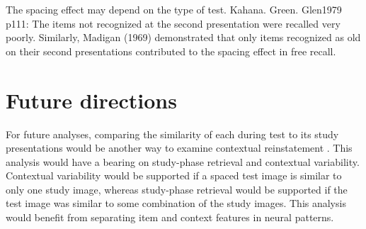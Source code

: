 The spacing effect may depend on the type of test. Kahana. Green. Glen1979 p111: The items not recognized at the second presentation were recalled very poorly. Similarly, Madigan (1969) demonstrated that only items recognized as old on their second presentations contributed to the spacing effect in free recall.







\section{Future directions}


For future analyses, comparing the similarity of each during test to its study presentations would be another way to examine contextual reinstatement \cite{HowaKaha2002,LohnKaha2014b}.  This analysis would have a bearing on study-phase retrieval and contextual variability.
Contextual variability would be supported if a spaced test image is similar to only one study image, whereas study-phase retrieval would be supported if the test image was similar to some combination of the study images.
This analysis would benefit from separating item and context features in neural patterns.

